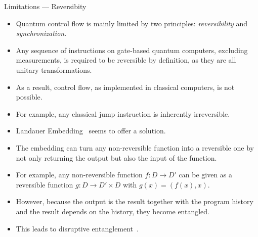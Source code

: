 \begin{frame}{Limitations --- Reversibity}
    \begin{itemize}
        \item Quantum control flow is mainly limited by two principles: \emph{reversibility} and \emph{synchronization}.
        \item Any sequence of instructions on gate-based quantum computers, excluding measurements, is required to be reversible by definition, as they are all unitary transformations.
        \item As a result, control flow, as implemented in classical computers, is not possible.
        \item For example, any classical jump instruction is inherently irreversible.
        \item Landauer Embedding~\cite{Land61} seems to offer a solution.
        \item The embedding can turn any non-reversible function into a reversible one by not only returning the output but also the input of the function.
        \item For example, any non-reversible function $f : D \to D'$ can be given as a reversible function $g : D \to D' \times D$ with $g(x) = (f(x), x)$.
        \item However, because the output is the result together with the program history and the result depends on the history, they become entangled.
        \item This leads to disruptive entanglement~\cite{YVC24}.
    \end{itemize}
\end{frame}

